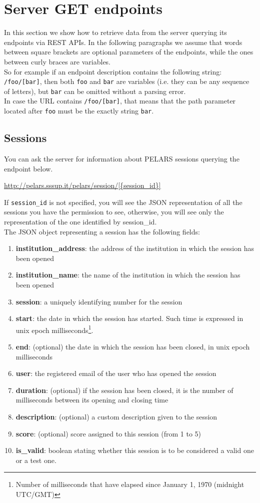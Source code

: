 \documentclass[a4paper,notitlepage,onecolumn]{hitec}  %
\begin{document}
\section{Server GET endpoints}
In this section we show how to retrieve data from the server querying its endpoints via REST APIs. In the following paragraphs we assume that words between square brackets are optional parameters of the endpoints, while the ones between curly braces are variables.\\ So for example if an endpoint description contains the following string: {\tt /{foo}/[{bar}]}, then both {\tt foo} and {\tt bar} are variables (i.e. they can be any sequence of letters), but {\tt bar} can be omitted without a parsing error.\\
In case the URL contains {\tt /{foo}/[bar]}, that means that the path parameter located after {\tt foo} must be the exactly string {\tt bar}.

\subsection{Sessions}
You can ask the server for information about PELARS sessions querying the endpoint below. 
\begin{center}
 \url{http://pelars.sssup.it/pelars/session/[{session\_id}]}
\end{center}
If {\tt session\_id} is not specified, you will see the JSON representation of all the sessions you have the permission to see, otherwise, you will see only the representation of the one identified by session\_id.\\
The JSON object representing a session has the following fields: 
\begin{enumerate}
\item\textbf{institution\_address}: the address of the institution in which the session has been opened
\item \textbf{institution\_name}: the name of the institution in which the session has been opened
\item\textbf{session}: a uniquely identifying number for the session
\item \textbf{start}: the date in which the session has started. Such time is expressed in unix epoch milliseconds\footnote{Number of milliseconds that have elapsed since January 1, 1970 (midnight UTC/GMT)}.
\item \textbf{end}: (optional) the date in which the session has been closed, in unix epoch milliseconds
\item \textbf{user}: the registered email of the user who has opened the session
\item \textbf{duration}: (optional) if the session has been closed, it is the number of milliseconds between its opening and closing time
\item \textbf{description}: (optional) a custom description given to the session
\item \textbf{score}: (optional) score assigned to this session (from 1 to 5)
\item \textbf{is\_valid}: boolean stating whether this session is to be considered a valid one or a test one.
\end{enumerate}
\end{document}
